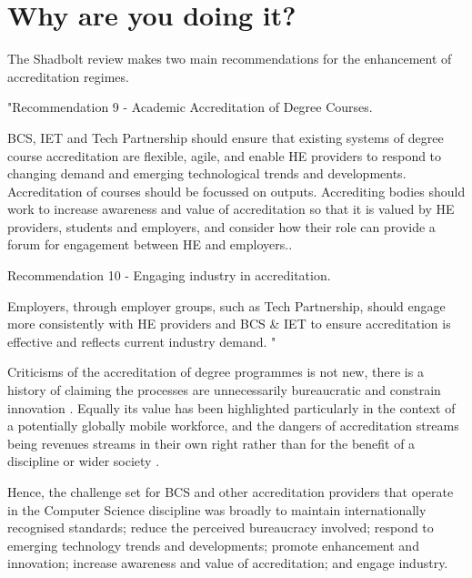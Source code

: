\documentclass[sigconf]{acmart}
\begin{document}
\section {Why are you doing it?}	

The Shadbolt review \cite[p.~8]{shadbolt2016shadbolt} makes two main recommendations for the enhancement of accreditation regimes.
\begin{center} 
	\begin{textit} 
	"Recommendation 9 - Academic Accreditation of Degree Courses.
	

		BCS, IET and Tech Partnership should ensure that existing systems of degree course
	accreditation are flexible, agile, and enable HE providers to respond to changing
	demand and emerging technological trends and developments. Accreditation of courses
	should be focussed on outputs. Accrediting bodies should work to increase awareness
	and value of accreditation so that it is valued by HE providers, students and employers,
	and consider how their role can provide a forum for engagement between HE and
	employers.. 

	Recommendation 10 - Engaging industry in accreditation.

	Employers, through employer groups, such as Tech Partnership, should engage more
	consistently with HE providers and BCS \& IET to ensure accreditation is effective and
	reflects current industry demand.
	"
	\end{textit}
\end{center}

Criticisms of the accreditation of degree programmes is not new, there is a history of claiming the processes are unnecessarily bureaucratic and constrain  innovation \cite{Harvey2004}. Equally its value has been highlighted particularly in the context of a potentially globally mobile workforce, and the dangers of accreditation streams being revenues streams in their own right rather than for the benefit of a discipline or wider society \cite{Knight_2015}.

Hence, the challenge set for BCS and other accreditation providers that operate in the Computer Science discipline was broadly to maintain internationally recognised standards; reduce the perceived bureaucracy involved; respond to emerging technology trends and developments; promote enhancement and innovation; increase awareness and value of accreditation; and engage industry.
\end{document}
